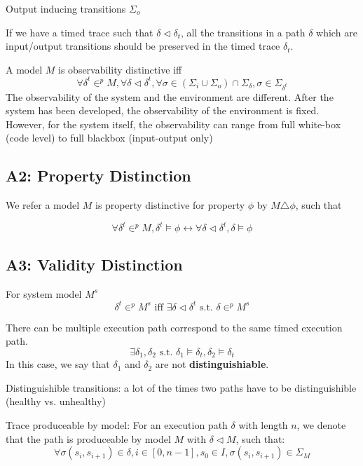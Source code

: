 \documentclass{llncs}
\begin{document}
Output inducing transitions $\Sigma_o$

If we have a timed trace such that $\delta\triangleleft\delta_t$, all the transitions in a path $\delta$ which are input/output transitions should be preserved in the timed trace $\delta_t$. 

A model $M$ is observability distinctive iff
$$\forall\delta^t\in^p M, \forall\delta\triangleleft\delta^t,\forall \sigma\in(\Sigma_i\cup\Sigma_o)\cap\Sigma_\delta,\sigma\in\Sigma_{\delta^t}$$
The observability of the system and the environment are different. After the system has been developed, the observability of the environment is fixed. However, for the system itself, the observability can range from full white-box (code level) to full blackbox (input-output only)

\subsection{A2: Property Distinction}
We refer a model $M$ is property distinctive for property $\phi$ by $M\triangle\phi$, such that

$$\forall \delta^t\in^p M, \delta^t\models\phi\leftrightarrow\forall \delta\triangleleft\delta^t,  \delta\models\phi$$

\subsection{A3: Validity Distinction}


For system model $M^s$
$$\delta^t\in^p M^s \text{ iff }\exists\delta\triangleleft\delta^t\text{ s.t. } \delta\in^p M^s$$


There can be multiple execution path correspond to the same timed execution path. 
$$\exists \delta_1,\delta_2\text{ s.t. } \delta_1\models\delta_t,\delta_2\models\delta_t$$
In this case, we say that $\delta_1$ and $\delta_2$ are not \textbf{distinguishiable}. 

Distinguishible transitions: a lot of the times two paths have to be distinguishible (healthy vs. unhealthy)


Trace produceable by model: For an execution path $\delta$ with length $n$, we denote that the path is produceable by model $M$ with $\delta\triangleleft M$, such that:
$$\forall \sigma(s_i,s_{i+1})\in \delta,i\in[0,n-1], s_0\in I, \sigma(s_i,s_{i+1})\in\Sigma_M$$
\end{document}
